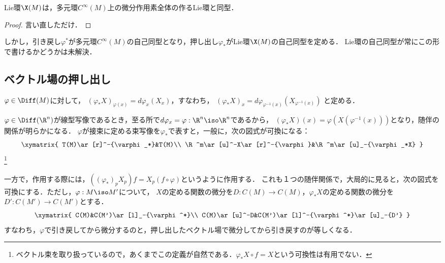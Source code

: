 \documentclass[uplatex,dvipdfmx]{jsreport}
\begin{document}
\begin{theorem}
    Lie環$\X(M)$は，多元環$C^\infty(M)$上の微分作用素全体の作るLie環と同型．
\end{theorem}
\begin{proof}
    言い直しただけ．
\end{proof}
\begin{remarks}
    しかし，引き戻し$\varphi^*$が多元環$C^\infty(M)$の自己同型となり，押し出し$\varphi_*$がLie環$\X(M)$の自己同型を定める．
    Lie環の自己同型が常にこの形で書けるかどうかは未解決．
\end{remarks}

\subsection{ベクトル場の押し出し}

\begin{definition}
    $\varphi\in\Diff(M)$に対して，
    $(\varphi_*X)_{\varphi(x)}=d\varphi_x(X_x)$，すなわち，
    $(\varphi_*X)_x=d\varphi_{\varphi^{-1}(x)}(X_{\varphi^{-1}(x)})$
    と定める．
\end{definition}
\begin{remarks}[写像としてのベクトル場]
    $\varphi\in\Diff(\R^n)$が線型写像であるとき，至る所で$d\varphi_x=\varphi:\R^n\iso\R^n$であるから，
    $(\varphi_*X)(x)=\varphi(X(\varphi^{-1}(x)))$となり，随伴の関係が明らかになる．
    $\varphi$が接束に定める束写像を$\varphi_*$で表すと，一般に，次の図式が可換になる：
    \[\xymatrix{
        T(M)\ar[r]^-{\varphi_*}&T(M)\\
        \R^m\ar[u]^-X\ar[r]^-{\varphi}&\R^m\ar[u]_-{\varphi_*X}
    }\]\footnote{ベクトル束を取り扱っているので，あくまでこの定義が自然である．$\varphi_*X\circ f=X$という可換性は有用でない．}
\end{remarks}
\begin{remarks}[作用素としてのベクトル場]
    一方で，作用する際には，$((\varphi_*)_pX_p)f=X_p(f\circ\varphi)$というように作用する．
    これも１つの随伴関係で，大局的に見ると，次の図式を可換にする．ただし，$\varphi:M\iso M'$について，
    $X$の定める関数の微分を$D:C(M)\to C(M)$，$\varphi_*X$の定める関数の微分を$D':C(M')\to C(M')$とする．
    \[\xymatrix{
        C(M)&C(M')\ar[l]_-{\varphi^*}\\
        C(M)\ar[u]^-D&C(M')\ar[l]^-{\varphi^*}\ar[u]_-{D'}
    }\]
    すなわち，$\varphi$で引き戻してから微分するのと，押し出したベクトル場で微分してから引き戻すのが等しくなる．
\end{remarks}
\end{document}
